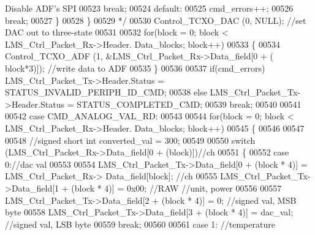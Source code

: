\begin{DoxyCode}
{      Disable ADF's SPI}
00523 \textcolor{comment}{                            break;}
00524 \textcolor{comment}{                            default:}
00525 \textcolor{comment}{                                cmd\_errors++;}
00526 \textcolor{comment}{                            break;}
00527 \textcolor{comment}{                        \}}
00528 \textcolor{comment}{                    \}}
00529 \textcolor{comment}{*/}
00530                     Control_TCXO_DAC (0, NULL); \textcolor{comment}{//set DAC out to three-state}
00531 
00532                     \textcolor{keywordflow}{for}(block = 0; block < LMS\_Ctrl\_Packet\_Rx->Header.
      Data_blocks; block++)
00533                     \{
00534                         Control_TCXO_ADF (1, &LMS\_Ctrl\_Packet\_Rx->Data_field[0 + (
      block*3)]); \textcolor{comment}{//write data to ADF}
00535                     \}
00536 
00537                     \textcolor{keywordflow}{if}(cmd_errors) LMS\_Ctrl\_Packet\_Tx->Header.Status = 
      STATUS_INVALID_PERIPH_ID_CMD;
00538                     \textcolor{keywordflow}{else} LMS\_Ctrl\_Packet\_Tx->Header.Status = 
      STATUS_COMPLETED_CMD;
00539                 \textcolor{keywordflow}{break};
00540 
00541 
00542                 \textcolor{keywordflow}{case} CMD_ANALOG_VAL_RD:
00543 
00544                     \textcolor{keywordflow}{for}(block = 0; block < LMS\_Ctrl\_Packet\_Rx->Header.
      Data_blocks; block++)
00545                     \{
00546 
00547 
00548                         \textcolor{comment}{//signed short int converted\_val = 300;}
00549 
00550                         \textcolor{keywordflow}{switch} (LMS\_Ctrl\_Packet\_Rx->Data_field[0 + (block)])\textcolor{comment}{//ch}
00551                         \{
00552                             \textcolor{keywordflow}{case} 0:\textcolor{comment}{//dac val}
00553 
00554                                 LMS\_Ctrl\_Packet\_Tx->Data_field[0 + (block * 4)] = LMS\_Ctrl\_Packet\_Rx->
      Data_field[block]; \textcolor{comment}{//ch}
00555                                 LMS\_Ctrl\_Packet\_Tx->Data_field[1 + (block * 4)] = 0x00; \textcolor{comment}{//RAW //unit, power}
00556 
00557                                 LMS\_Ctrl\_Packet\_Tx->Data_field[2 + (block * 4)] = 0; \textcolor{comment}{//signed val, MSB byte}
00558                                 LMS\_Ctrl\_Packet\_Tx->Data_field[3 + (block * 4)] = 
      dac_val; \textcolor{comment}{//signed val, LSB byte}
00559                                 \textcolor{keywordflow}{break};
00560 
00561                             \textcolor{keywordflow}{case} 1: \textcolor{comment}{//temperature}

\end{DoxyCode}
